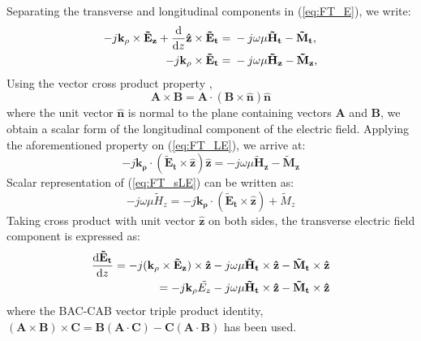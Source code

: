 \documentclass[11pt]{article}
\renewcommand{\v}[1]{\mathbf{#1}} %
\newcommand{\ti}[1]{\tilde{#1}} %
\renewcommand{\O}{\omega}  %
\renewcommand{\u}{\mu}  %
\newcommand{\p}{\rho}  %
\newcommand{\x}{\times}  %
\renewcommand{\^}{\hat}  %
\begin{document}
  Separating the transverse and longitudinal components in (\ref{eq:FT_E}), we write:
  \begin{subequations}
    \begin{align}
      -j\v{k_{\p}} \x \v{\ti{E}_z} +
      \dv{}{z}\v{\^{z}} \x \v{\ti{E}_t} ={}&
      -j \O \u \v{\ti{H}_t} -
      \v{\ti{M}_t},
      \label{eq:FT_TE}\\
      -j\v{k_{\p}} \x \v{\ti{E}_t} ={}&
      -j \O \u \v{\ti{H}_z} -
      \v{\ti{M}_z},
      \label{eq:FT_LE}
    \end{align}
    \label{eq:FT_TLE}
  \end{subequations}
  Using the vector cross product property \cite[p. 117]{fang2009antenna},
  \begin{equation}
    \v{A}\x\v{B} =\v{A}\cdot (\v{B} \x \v{\^{n}})\v{\^{n}}
    \label{eq:vec}
  \end{equation}
  where the unit vector $\v{\^{n}}$ is normal to the plane containing vectors $\v{A}$ and $\v{B}$, we obtain a scalar form of the longitudinal component of the electric field. Applying the aforementioned property on (\ref{eq:FT_LE}), we arrive at:
  \begin{equation}
    -j \v{k_{\p}} \cdot (\v{\ti{E}_t} \x \v{\^{z}})\v{\^{z}} =
    -j \O \u \v{\ti{H}_z} - \v{\ti{M}_z}
    \label{eq:FT_sLE}
  \end{equation}
  Scalar representation of (\ref{eq:FT_sLE}) can be written as:
  \begin{equation}
    -j \O \u \ti{H}_z =
    -j \v{k_{\p}} \cdot (\v{\ti{E}_t} \x \v{\^{z}}) + {\ti{M}_z}
    \label{eq:sLH}
  \end{equation}
  Taking cross product with unit vector $\v{\^{z}}$ on both sides, the transverse electric field component is expressed as:
  \begin{equation}
    \begin{split}
      \dv{\v{\ti{E}_t}}{z} = -j (\v{k_{\p}} \x \v{\ti{E}_z}) \x \v{\^{z}}
      -j \O \u \v{\ti{H}_t} \x \v{\^{z}}  -
      \v{\ti{M}_t} \x \v{\^{z}} \\
      = -j \v{k_{\p}} \ti{{E}_z} -j \O \u \v{\ti{H}_t} \x \v{\^{z}}  -
      \v{\ti{M}_t} \x \v{\^{z}}
    \end{split}
    \label{eq:dFT_ET}
  \end{equation}
  where the BAC-CAB vector triple product identity, $(\v{A} \x \v{B})\x\v{C} = \v{B}(\v{A} \cdot \v{C}) - \v{C}(\v{A} \cdot \v{B})$ has been used.
\end{document}
